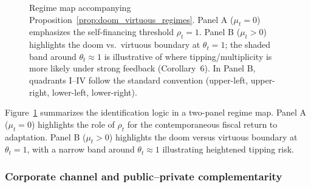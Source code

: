 \documentclass[12pt]{article}
\begin{document}
\begin{figure}[t]

\caption{Regime map accompanying Proposition~\ref{prop:doom_virtuous_regimes}.
Panel A ($\mu_t=0$) emphasizes the self-financing threshold $\rho_t=1$.
Panel B ($\mu_t>0$) highlights the doom vs.\ virtuous boundary at $\theta_t=1$;
the shaded band around $\theta_t\approx 1$ is illustrative of where tipping/multiplicity is more likely under strong feedback
(Corollary~6). In Panel B, quadrants I--IV follow the standard convention (upper-left, upper-right, lower-left, lower-right).}
\label{fig:regime_map_two_panel_clean}
\end{figure}




Figure~\ref{fig:regime_map_two_panel_clean} summarizes the identification logic in a two-panel regime map.
Panel A ($\mu_t=0$) highlights the role of $\rho_t$ for the contemporaneous fiscal return to adaptation. Panel B ($\mu_t>0$) highlights
the doom versus virtuous boundary at $\theta_t=1$, with a narrow band around $\theta_t\approx 1$ illustrating heightened tipping risk.

\subsubsection{Corporate channel and public--private complementarity}
\label{subsec:corporate_channel_B}
\end{document}
